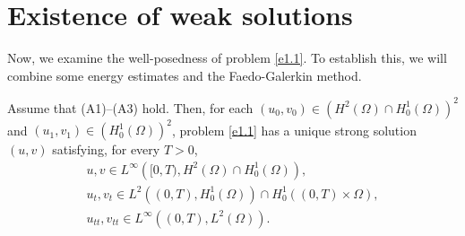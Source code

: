 \documentclass[reqno]{amsart}
\begin{document}
\section{Existence of weak solutions}
Now, we examine the well-posedness of problem \eqref{e1.1}. To establish this, we will combine some energy estimates and the Faedo-Galerkin method.

\begin{theorem} \label{thm3}
 Assume that {\rm (A1)--(A3)} hold.
Then, for each $ (u_0,v_0) \in \left( H^2(\Omega) \cap H^1_0(\Omega)\right)^2$ and
$(u_1,v_1) \in \left( H^1_0(\Omega)\right)^2$, problem \eqref{e1.1} has a unique strong solution
$(u, v)$ satisfying, for every $T > 0$,
\begin{gather*}
u, v \in L^{\infty}\left( [0, T), H^2(\Omega) \cap H^1_0(\Omega)\right),\\
u_{t}, v_{t} \in L^2\left( (0, T), H^1_0(\Omega)\right)\cap H^1_0 \left( (0, T)\times \Omega\right),\\
u_{tt}, v_{tt} \in L^{\infty}\left( (0, T), L^2(\Omega)\right).
\end{gather*}
 \end{theorem}
\end{document}
